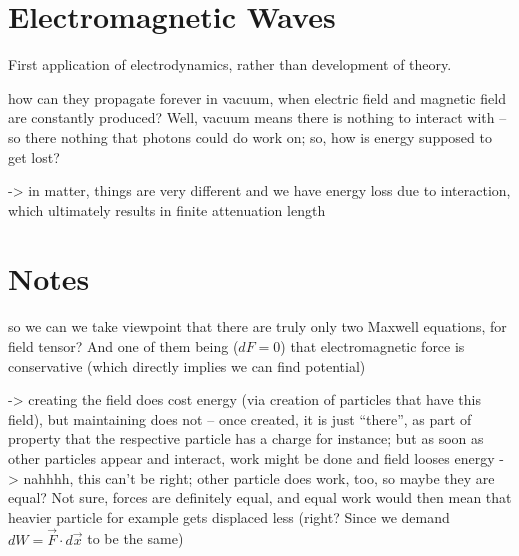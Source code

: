 \documentclass[../class_mech_main.tex]{subfiles}
\begin{document}
    \section{Electromagnetic Waves}
First application of electrodynamics, rather than development of theory.






how can they propagate forever in vacuum, when electric field and magnetic field are constantly produced? Well, vacuum means there is nothing to interact with -- so there nothing that photons could do work on; so, how is energy supposed to get lost?


-> in matter, things are very different and we have energy loss due to interaction, which ultimately results in finite attenuation length



    \section{Notes}

so we can we take viewpoint that there are truly only two Maxwell equations, for field tensor? And one of them being ($dF = 0$) that electromagnetic force is conservative (which directly implies we can find potential)



-> creating the field does cost energy (via creation of particles that have this field), but maintaining does not -- once created, it is just \enquote{there}, as part of property that the respective particle has a charge for instance; but as soon as other particles appear and interact, work might be done and field looses energy -> nahhhh, this can't be right; other particle does work, too, so maybe they are equal? Not sure, forces are definitely equal, and equal work would then mean that heavier particle for example gets displaced less (right? Since we demand $dW = \vec{F} \cdot d\vec{x}$ to be the same)
\end{document}
